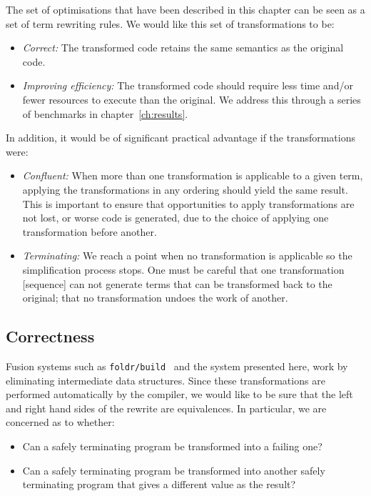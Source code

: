 The set of optimisations that have been described in this chapter can be seen as
a set of term rewriting rules. We would like this set of transformations to be:
%
\begin{itemize}
    \item \emph{Correct:} The transformed code retains the same semantics as the
        original code.

    \item \emph{Improving efficiency:} The transformed code should require less
        time and/or fewer resources to execute than the original. We address
        this through a series of benchmarks in chapter~\ref{ch:results}.
\end{itemize}
%
In addition, it would be of significant practical advantage if the
transformations were:
%
\begin{itemize}
    \item \emph{Confluent:} When more than one transformation is applicable to a
        given term, applying the transformations in any ordering should yield
        the same result. This is important to ensure that opportunities to apply
        transformations are not lost, or worse code is generated, due to the
        choice of applying one transformation before another.

    \item \emph{Terminating:} We reach a point when no transformation is
        applicable so the simplification process stops. One must be careful that
        one transformation [sequence] can not generate terms that can be
        transformed back to the original; that no transformation undoes the work
        of another.
\end{itemize}


\subsection{Correctness}

Fusion systems such as \texttt{foldr/build}~\cite{Gill:1993de} and the system
presented here, work by eliminating intermediate data structures. Since these
transformations are performed automatically by the compiler, we would like to be
sure that the left and right hand sides of the rewrite are equivalences.
In particular, we are concerned as to whether:
%
\begin{itemize}
    \item Can a safely terminating program be transformed into a failing one?
    \item Can a safely terminating program be transformed into another safely
        terminating program that gives a different value as the result?
\end{itemize}

